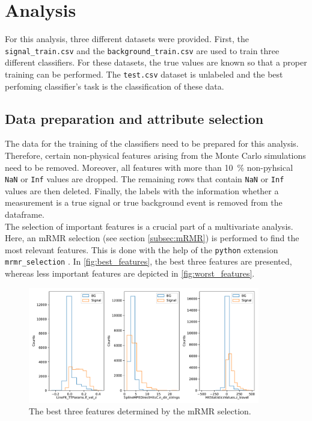 \section{Analysis}
\label{sec:Analysis}
For this analysis, three different datasets were provided. First, the \texttt{signal\_train.csv} and the \texttt{background\_train.csv} are used to train three different classifiers. For these datasets,
the true values are known so that a proper training can be performed. The \texttt{test.csv} dataset is unlabeled and the best perfoming classifier's task is the classification of these data.

\subsection{Data preparation and attribute selection}
The data for the training of the classifiers need to be prepared for this analysis. Therefore, certain non-physical features arising from the Monte Carlo simulations need to be removed. Moreover, all 
features with more than \qty{10}{\percent} non-pyhsical \texttt{NaN} or \texttt{Inf} values are dropped. The remaining rows that contain \texttt{NaN} or \texttt{Inf} values are then deleted. Finally, the
labels with the information whether a measurement is a true signal or true background event is removed from the dataframe. \\
The selection of important features is a crucial part of a multivariate analysis. Here, an mRMR selection (see section \ref{subsec:mRMR}) is performed to find the most relevant features. This is done with the help of the \texttt{python}
extension \texttt{mrmr\_selection} \cite{mrmr}. In \autoref{fig:best_features}, the best three features are presented, whereas less important features are depicted in \autoref{fig:worst_features}.
\begin{figure}
    \centering
    \includegraphics[width=0.9\textwidth]{content/plots/best_3_features.pdf}
    \caption{The best three features determined by the mRMR selection.}
    \label{fig:best_features}
\end{figure}

